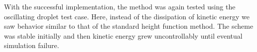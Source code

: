  With the successful implementation, the method was again tested using the oscillating droplet test case. Here, instead of the dissipation of kinetic energy we saw behavior similar to that of the standard height function method. The scheme was stable initially and then kinetic energy grew uncontrollably until eventual simulation failure.
